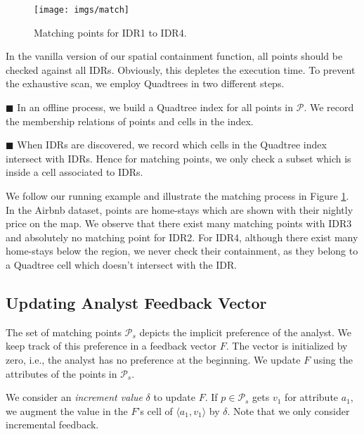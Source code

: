 \documentclass{vldb}
\begin{document}
\begin{figure}[t]
\centering
   \texttt{[image: imgs/match]}
  \caption{Matching points for IDR1 to IDR4.}
  \label{fig:match}
\end{figure}

\vspace{2pt}
In the vanilla version of our spatial containment function, all points should be checked against all IDRs. Obviously, this depletes the execution time. To prevent the exhaustive scan, we employ Quadtrees in two different steps.

\vspace{4pt}
\noindent $\blacksquare$ In an offline process, we build a Quadtree index for all points in $\mathcal{P}$. We record the membership relations of points and cells in the index.

\vspace{2pt}
\noindent $\blacksquare$ When IDRs are discovered, we record which cells in the Quadtree index intersect with IDRs. Hence for matching points, we only check a subset which is inside a cell associated to IDRs.

\vspace{4pt}
We follow our running example and illustrate the matching process in Figure \ref{fig:match}. In the Airbnb dataset, points are home-stays which are shown with their nightly price on the map. We observe that there exist many matching points with IDR3 and absolutely no matching point for IDR2. For IDR4, although there exist many home-stays below the region, we never check their containment, as they belong to a Quadtree cell which doesn't intersect with the IDR. 

\subsection{Updating Analyst Feedback Vector}
The set of matching points $\mathcal{P}_s$ depicts the implicit preference of the analyst. We keep track of this preference in a feedback vector $F$. The vector is initialized by zero, i.e., the analyst has no preference at the beginning. We update $F$ using the attributes of the points in $\mathcal{P}_s$.

\vspace{2pt}
We consider an {\em increment value} $\delta$ to update $F$. If $p \in \mathcal{P}_s$ gets $v_1$ for attribute $a_1$, we augment the value in the $F$'s cell of $\langle a_1, v_1 \rangle$ by $\delta$. Note that we only consider incremental feedback.
\end{document}
